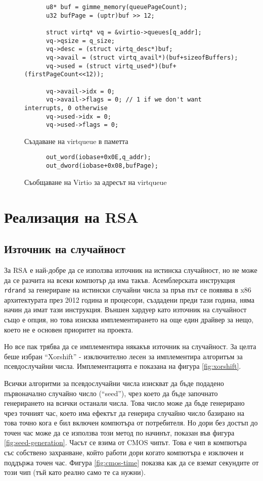   \begin{figure}[ht]
    \centering
    \begin{verbatim}
      u8* buf = gimme_memory(queuePageCount);
      u32 bufPage = (uptr)buf >> 12;

      struct virtq* vq = &virtio->queues[q_addr];
      vq->qsize = q_size;
      vq->desc = (struct virtq_desc*)buf;
      vq->avail = (struct virtq_avail*)(buf+sizeofBuffers);
      vq->used = (struct virtq_used*)(buf+(firstPageCount<<12));

      vq->avail->idx = 0;
      vq->avail->flags = 0; // 1 if we don't want interrupts, 0 otherwise
      vq->used->idx = 0;
      vq->used->flags = 0;
    \end{verbatim}
    \caption{Създаване на virtqueue в паметта}
    \label{fig:preparing-virtqueue}
  \end{figure}

  \begin{figure}[ht]
    \centering
    \begin{verbatim}
      out_word(iobase+0x0E,q_addr);
      out_dword(iobase+0x08,bufPage);
    \end{verbatim}
    \caption{Съобщаване на Virtio за адресът на virtqueue}
    \label{fig:giving-virtqueue}
  \end{figure}

\section{Реализация на RSA}
  \subsection{Източник на случайност}
  За RSA е най-добре да се използва източник на истинска случайност, но не може да се разчита на всеки компютър да има такъв. Асемблерската инструкция {\tt rdrand} за генериране на истински случайни числа за пръв път се появява в x86 архитектурата през 2012 година и процесори, създадени преди тази година, няма начин да имат тази инструкция. Външен хардуер като източник на случайност също е опция, но това изисква имплементирането на още един драйвер за нещо, което не е основен приоритет на проекта.

  Но все пак трябва да се имплементира някакъв източник на случайност. За целта беше избран ``Xorshift'' - изключително лесен за имплементира алгоритъм за псевдослучайни числа. Имплементацията е показана на фигура \ref{fig:xorshift}.

  Всички алгоритми за псевдослучайни числа изискват да бъде подадено първоначално случайно число (``seed''), чрез което да бъде започнато генерирането на всички останали числа. Това число може да бъде генерирано чрез точният час, което има ефектът да генерира случайно число базирано на това точно кога е бил включен компютъра от потребителя. Но дори без достъп до точен час може да се използва този метод по начинът, показан във фигура \ref{fig:seed-generation}. Часът се взима от CMOS чипът. Това е чип в компютъра със собствено захранване, който работи дори когато компютъра е изключен и поддържа точен час. Фигура \ref{fig:cmos-time} показва как да се вземат секундите от този чип (тъй като реално само те са нужни).

